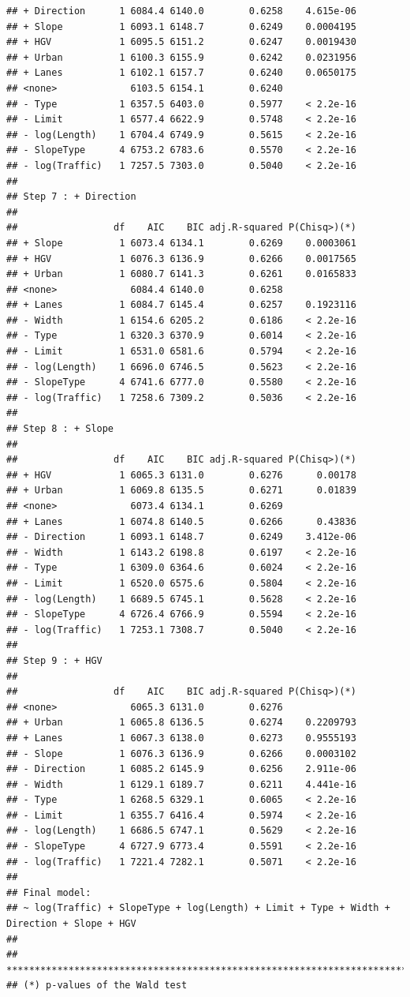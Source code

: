 \documentclass[
]{article}
\begin{document}
\begin{verbatim}
## + Direction      1 6084.4 6140.0        0.6258    4.615e-06
## + Slope          1 6093.1 6148.7        0.6249    0.0004195
## + HGV            1 6095.5 6151.2        0.6247    0.0019430
## + Urban          1 6100.3 6155.9        0.6242    0.0231956
## + Lanes          1 6102.1 6157.7        0.6240    0.0650175
## <none>             6103.5 6154.1        0.6240             
## - Type           1 6357.5 6403.0        0.5977    < 2.2e-16
## - Limit          1 6577.4 6622.9        0.5748    < 2.2e-16
## - log(Length)    1 6704.4 6749.9        0.5615    < 2.2e-16
## - SlopeType      4 6753.2 6783.6        0.5570    < 2.2e-16
## - log(Traffic)   1 7257.5 7303.0        0.5040    < 2.2e-16
## 
## Step 7 : + Direction 
## 
##                 df    AIC    BIC adj.R-squared P(Chisq>)(*)
## + Slope          1 6073.4 6134.1        0.6269    0.0003061
## + HGV            1 6076.3 6136.9        0.6266    0.0017565
## + Urban          1 6080.7 6141.3        0.6261    0.0165833
## <none>             6084.4 6140.0        0.6258             
## + Lanes          1 6084.7 6145.4        0.6257    0.1923116
## - Width          1 6154.6 6205.2        0.6186    < 2.2e-16
## - Type           1 6320.3 6370.9        0.6014    < 2.2e-16
## - Limit          1 6531.0 6581.6        0.5794    < 2.2e-16
## - log(Length)    1 6696.0 6746.5        0.5623    < 2.2e-16
## - SlopeType      4 6741.6 6777.0        0.5580    < 2.2e-16
## - log(Traffic)   1 7258.6 7309.2        0.5036    < 2.2e-16
## 
## Step 8 : + Slope 
## 
##                 df    AIC    BIC adj.R-squared P(Chisq>)(*)
## + HGV            1 6065.3 6131.0        0.6276      0.00178
## + Urban          1 6069.8 6135.5        0.6271      0.01839
## <none>             6073.4 6134.1        0.6269             
## + Lanes          1 6074.8 6140.5        0.6266      0.43836
## - Direction      1 6093.1 6148.7        0.6249    3.412e-06
## - Width          1 6143.2 6198.8        0.6197    < 2.2e-16
## - Type           1 6309.0 6364.6        0.6024    < 2.2e-16
## - Limit          1 6520.0 6575.6        0.5804    < 2.2e-16
## - log(Length)    1 6689.5 6745.1        0.5628    < 2.2e-16
## - SlopeType      4 6726.4 6766.9        0.5594    < 2.2e-16
## - log(Traffic)   1 7253.1 7308.7        0.5040    < 2.2e-16
## 
## Step 9 : + HGV 
## 
##                 df    AIC    BIC adj.R-squared P(Chisq>)(*)
## <none>             6065.3 6131.0        0.6276             
## + Urban          1 6065.8 6136.5        0.6274    0.2209793
## + Lanes          1 6067.3 6138.0        0.6273    0.9555193
## - Slope          1 6076.3 6136.9        0.6266    0.0003102
## - Direction      1 6085.2 6145.9        0.6256    2.911e-06
## - Width          1 6129.1 6189.7        0.6211    4.441e-16
## - Type           1 6268.5 6329.1        0.6065    < 2.2e-16
## - Limit          1 6355.7 6416.4        0.5974    < 2.2e-16
## - log(Length)    1 6686.5 6747.1        0.5629    < 2.2e-16
## - SlopeType      4 6727.9 6773.4        0.5591    < 2.2e-16
## - log(Traffic)   1 7221.4 7282.1        0.5071    < 2.2e-16
## 
## Final model:
## ~ log(Traffic) + SlopeType + log(Length) + Limit + Type + Width + Direction + Slope + HGV 
## 
## ****************************************************************************
## (*) p-values of the Wald test
\end{verbatim}
\end{document}
